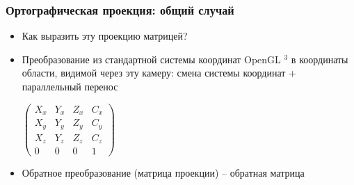 \documentclass[10pt]{beamer}
\begin{document}
\begin{frame}[fragile]
\frametitle{Ортографическая проекция: общий случай}
\begin{itemize}
\item Как выразить эту проекцию матрицей?
\pause
\item Преобразование из стандартной системы координат OpenGL \begin{math}[-1, 1]^3\end{math} в координаты области, видимой через эту камеру: смена системы координат + параллельный перенос
\begin{center}
\begin{math}
\begin{pmatrix}
X_x & Y_x & Z_x & C_x \\
X_y & Y_y & Z_y & C_y \\
X_z & Y_z & Z_z & C_z \\
0 & 0 & 0 & 1
\end{pmatrix}
\end{math}
\end{center}
\pause
\item Обратное преобразование (матрица проекции) -- обратная матрица
\end{itemize}
\end{frame}
\end{document}
